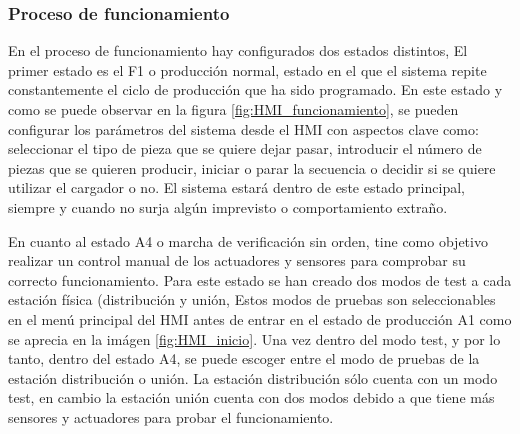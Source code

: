 \subsubsection{Proceso de funcionamiento}

En el proceso de funcionamiento hay configurados dos estados distintos, El primer estado es el F1 o producción normal, estado en el que el sistema repite constantemente el ciclo de producción que ha sido programado. En este estado y como se puede observar en la figura \ref{fig:HMI_funcionamiento}, se pueden configurar los parámetros del sistema desde el HMI con aspectos clave como: seleccionar el tipo de pieza que se quiere dejar pasar, introducir el número de piezas que se quieren producir,  iniciar o parar la secuencia o decidir si se quiere utilizar el cargador o no. El sistema estará dentro de este estado principal, siempre y cuando no surja algún imprevisto o comportamiento extraño.

En cuanto al estado A4 o marcha de verificación sin orden, tine como objetivo realizar un control manual de los actuadores y sensores para comprobar su correcto funcionamiento. Para este estado se han creado dos modos de test a cada estación física (distribución y unión, Estos modos de pruebas son seleccionables en el menú principal del HMI antes de entrar en el estado de producción A1 como se aprecia en la imágen \ref{fig:HMI_inicio}. Una vez dentro del modo test, y por lo tanto, dentro del estado A4, se puede escoger entre el modo de pruebas de la estación distribución o unión. La estación distribución sólo cuenta con un modo test, en cambio la estación unión cuenta con dos modos debido a que tiene más sensores y actuadores para probar el funcionamiento.

